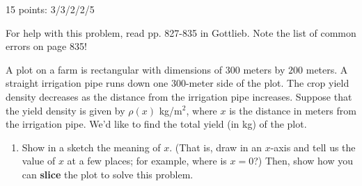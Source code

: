 \documentclass{article}
\begin{document}
\begin{enumerate}
\begin{grading}
   15 points: 3/3/2/2/5
\end{grading}

For help with this problem, read pp. 827-835 in Gottlieb. Note the list of common
  errors on page 835!

  A plot on a farm is rectangular with dimensions of
  $300$ meters by $200$ meters.  A straight irrigation pipe runs down one
  300-meter side of the plot.  The crop yield density decreases as the
  distance from the irrigation pipe increases.  Suppose that the yield
  density is given by $\rho(x)$ kg/m$^2$, where $x$ is the distance in
  meters from the irrigation pipe.  We'd like to find the total yield (in
  kg) of the plot.

  \begin{enumerate}

  \item
    \begin{problem}[\stretch{2}]
      Show in a sketch the meaning of $x$.  (That is, draw in an $x$-axis
      and tell us the value of $x$ at a few places; for example, where is
      $x = 0$?)  Then, show how you can \textbf{slice} the plot to solve
      this problem.
    \end{problem}


\end{enumerate}
\end{enumerate}
\end{document}
